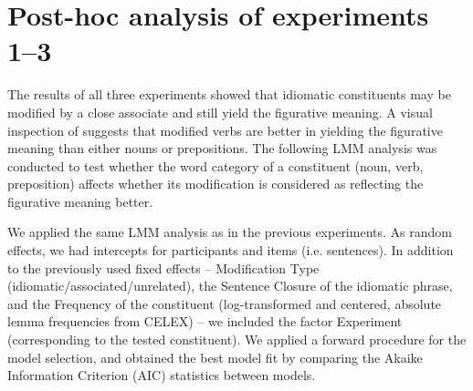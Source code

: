 \documentclass[output=paper]{langsci/langscibook}
\begin{document}
\begin{table}
\caption{Fixed effects of the predictors in the linear mixed-effect model for the paraphrase ratings in Experiment 3. \textit{Notes:} significance code: *** < 0.0001\label{tab:Table7}}
\end{table}


\section{Post-hoc analysis of experiments 1--3}    

The results of all three experiments showed that idiomatic constituents may be modified by a close associate and still yield the figurative meaning. A visual inspection of  suggests that modified verbs are better in yielding the figurative meaning than either nouns or prepositions. The following LMM analysis was conducted to test whether the word category of a constituent (noun, verb, preposition) affects whether its modification is considered as reflecting the figurative meaning better. 

We applied the same LMM analysis as in the previous experiments. As random effects, we had intercepts for participants and items (i.e. sentences). In addition to the previously used fixed effects -- Modification Type (idiomatic\slash associated\slash unrelated), the Sentence Closure of the idiomatic phrase, and the Frequency of the constituent (log-transformed and centered, absolute lemma frequencies from CELEX) -- we included the factor Experiment (corresponding to the tested constituent).  We applied a forward procedure for the model selection, and obtained the best model fit by comparing the Akaike Information Criterion (AIC) statistics between models. 
\end{document}
